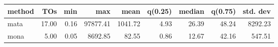 \begin{tabular}{lrrrrrrrr}
\hline
 method   &   TOs &   min &      max &    mean &   q(0.25) &   median &   q(0.75) &   std. dev \\
\hline
 mata     & 17.00 &  0.16 & 97877.41 & 1041.72 &      4.93 &    26.39 &     48.24 &    8292.23 \\
 mona     &  5.00 &  0.05 &  8692.85 &   82.55 &      0.86 &    12.67 &     42.16 &     547.51 \\
\hline
\end{tabular}
